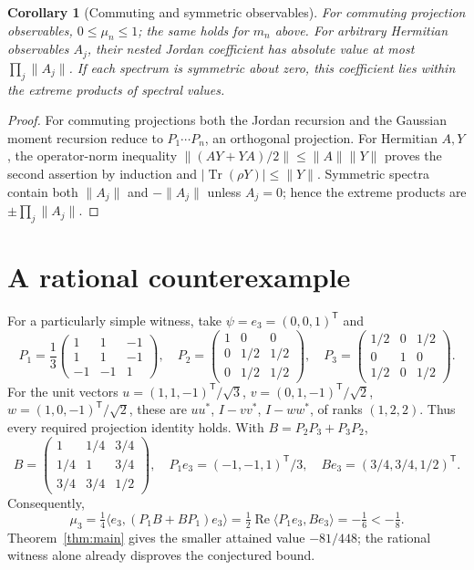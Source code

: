\documentclass[11pt,a4paper]{article}
\newtheorem{corollary}[theorem]{Corollary}
\newcommand{\Id}{I}
\newcommand{\tr}{\operatorname{Tr}}
\begin{document}
\begin{corollary}[Commuting and symmetric observables]\label{cor:commuting}
For commuting projection observables, $0\leq\mu_n\leq1$; the same holds
for $m_n$ above. For arbitrary Hermitian observables $A_j$, their nested
Jordan coefficient has absolute value at most $\prod_j\|A_j\|$.
If each spectrum is symmetric about zero, this coefficient lies within
the extreme products of spectral values.
\end{corollary}
\begin{proof}
For commuting projections both the Jordan recursion and the Gaussian
moment recursion reduce to $P_1\cdots P_n$, an orthogonal projection.
For Hermitian $A,Y$, the operator-norm inequality
$\|(AY+YA)/2\|\leq\|A\|\|Y\|$ proves the second assertion by induction
and $|\tr(\rho Y)|\leq\|Y\|$.
Symmetric spectra contain both $\|A_j\|$ and $-\|A_j\|$ unless
$A_j=0$; hence the extreme products are $\pm\prod_j\|A_j\|$.
\end{proof}

\section{A rational counterexample}

For a particularly simple witness, take $\psi=e_3=(0,0,1)^{\mathsf T}$ and
\[
 P_1=\frac13\begin{pmatrix}1&1&-1\\1&1&-1\\-1&-1&1\end{pmatrix},\quad
 P_2=\begin{pmatrix}1&0&0\\0&1/2&1/2\\0&1/2&1/2\end{pmatrix},\quad
 P_3=\begin{pmatrix}1/2&0&1/2\\0&1&0\\1/2&0&1/2\end{pmatrix}.
\]
For the unit vectors $u=(1,1,-1)^{\mathsf T}/\sqrt3$,
$v=(0,1,-1)^{\mathsf T}/\sqrt2$, $w=(1,0,-1)^{\mathsf T}/\sqrt2$,
these are $uu^*$, $\Id-vv^*$, $\Id-ww^*$, of ranks $(1,2,2)$.
Thus every required projection identity holds. With $B=P_2P_3+P_3P_2$,
\[
 B=\begin{pmatrix}1&1/4&3/4\\1/4&1&3/4\\3/4&3/4&1/2\end{pmatrix},\quad
 P_1e_3=(-1,-1,1)^{\mathsf T}/3,\quad
 Be_3=(3/4,3/4,1/2)^{\mathsf T}.
\]
Consequently,
\[
 \boxed{\mu_3=\tfrac14\langle e_3,(P_1B+BP_1)e_3\rangle
 =\tfrac12\operatorname{Re}\langle P_1e_3,Be_3\rangle
 =-\tfrac16<-\tfrac18.}
\]
Theorem~\ref{thm:main} gives the smaller attained value $-81/448$;
the rational witness alone already disproves the conjectured bound.
\end{document}
